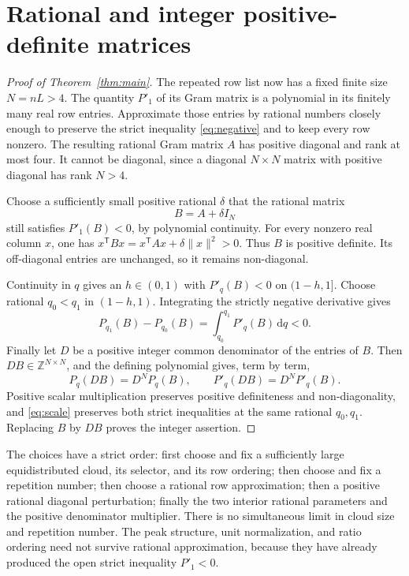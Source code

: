 \documentclass[11pt]{article}
\theoremstyle{remark}
\newcommand{\Z}{\mathbb Z}
\newcommand{\dd}{\,\mathrm d}
\begin{document}
\section{Rational and integer positive-definite matrices}
\begin{proof}[Proof of Theorem~\ref{thm:main}]
The repeated row list now has a fixed finite size $N=nL>4$. The quantity $P'_1$ of its Gram matrix is a polynomial in its finitely many real row entries. Approximate those entries by rational numbers closely enough to preserve the strict inequality \eqref{eq:negative} and to keep every row nonzero. The resulting rational Gram matrix $A$ has positive diagonal and rank at most four. It cannot be diagonal, since a diagonal $N\times N$ matrix with positive diagonal has rank $N>4$.

Choose a sufficiently small positive rational $\delta$ that the rational matrix
\[
 B=A+\delta I_N
\]
still satisfies $P'_1(B)<0$, by polynomial continuity. For every nonzero real column $x$, one has $x^{\mathsf T}Bx=x^{\mathsf T}Ax+\delta\|x\|^2>0$. Thus $B$ is positive definite. Its off-diagonal entries are unchanged, so it remains non-diagonal.

Continuity in $q$ gives an $h\in(0,1)$ with $P'_q(B)<0$ on $(1-h,1]$. Choose rational $q_0<q_1$ in $(1-h,1)$. Integrating the strictly negative derivative gives
\[
 P_{q_1}(B)-P_{q_0}(B)=\int_{q_0}^{q_1}P'_q(B)\dd q<0.
\]
Finally let $D$ be a positive integer common denominator of the entries of $B$. Then $DB\in\Z^{N\times N}$, and the defining polynomial gives, term by term,
\begin{equation}\label{eq:scale}
 P_q(DB)=D^NP_q(B),\qquad P'_q(DB)=D^NP'_q(B).
\end{equation}
Positive scalar multiplication preserves positive definiteness and non-diagonality, and \eqref{eq:scale} preserves both strict inequalities at the same rational $q_0,q_1$. Replacing $B$ by $DB$ proves the integer assertion.
\end{proof}

The choices have a strict order: first choose and fix a sufficiently large equidistributed cloud, its selector, and its row ordering; then choose and fix a repetition number; then choose a rational row approximation; then a positive rational diagonal perturbation; finally the two interior rational parameters and the positive denominator multiplier. There is no simultaneous limit in cloud size and repetition number. The peak structure, unit normalization, and ratio ordering need not survive rational approximation, because they have already produced the open strict inequality $P'_1<0$.
\end{document}

